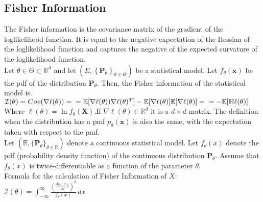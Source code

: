 
\subsection{Fisher Information}

The Fisher information is the covariance matrix of the gradient of the loglikelihood function. It is equal to the negative expectation of the Hessian of the loglikelihood function and captures the negative of the expected curvature of the loglikelihood function.\\

Let $\theta \in \Theta \subset \mathbb {R}^ d$ and let $\left(E,\left\{ \mathbf{P}_\theta \right\} _{\theta \in \Theta }\right)$ be a statistical model. Let $f_{\theta }(\mathbf x)$ be the pdf of the distribution $\mathbf{P}_\theta$. Then, the Fisher information of the statistical model is.\\

$\mathcal{I}(\theta) = Cov(\nabla \ell(\theta)) = \\ = \mathbb{E}[\nabla \ell(\theta))\nabla\ell(\theta)^T] -  \mathbb{E}[\nabla \ell(\theta)]\mathbb{E}[\nabla \ell(\theta)] =\\ = -\mathbb{E}[\mathbb{H}\ell(\theta)]$\\

Where $\ell (\theta ) = \ln f_\theta (\mathbf X)$.If $\nabla\ell(\theta) \in \mathbb{R}^d$ it is a $d \times d$ matrix. The definition when the distribution has a pmf $p_\theta (\mathbf x)$ is also the same, with the expectation taken with respect to the pmf.\\

Let $(\mathbb {R}, \{ \mathbf{P}_\theta \} _{\theta \in \mathbb {R}})$ denote a continuous statistical model. Let $f_\theta (x)$ denote the pdf (probability density function) of the continuous distribution $\mathbf{P}_\theta$. Assume that $f_\theta (x)$ is twice-differentiable as a function of the parameter $\theta$.\\

Formula for the calculation of Fisher Information of $X$:\\

$\mathcal{I}(\theta )= \int _{-\infty }^\infty \frac{\left(\frac{\partial f_\theta (x)}{\partial \theta }\right)^2}{f_\theta (x)} \,  dx$ \\

